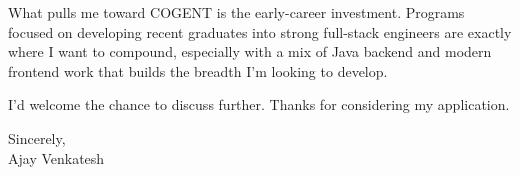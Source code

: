 \documentclass[letterpaper,11pt]{article}
\begin{document}
What pulls me toward COGENT is the early-career investment. Programs focused on developing recent graduates into strong full-stack engineers are exactly where I want to compound, especially with a mix of Java backend and modern frontend work that builds the breadth I'm looking to develop.

I'd welcome the chance to discuss further. Thanks for considering my application.

\vspace{12pt}
Sincerely, \\
Ajay Venkatesh
\end{document}
